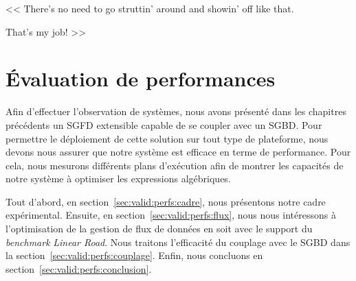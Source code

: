 \begin{savequote}[6cm]
<< There's no need to go struttin' around and showin' off like that. 

\quad That's my job! >>
\end{savequote}

\chapter{Évaluation de performances}\label{chap:valid:perfs}
\chaptertoc

Afin d'effectuer l'observation de systèmes, nous avons présenté dans les chapitres précédents un SGFD extensible capable de se coupler avec un SGBD. Pour permettre le déploiement de cette solution sur tout type de plateforme, nous devons nous assurer que notre système est efficace en terme de performance. Pour cela, nous mesurons différents plans d'exécution afin de montrer les capacités de notre système à optimiser les expressions algébriques.

Tout d'abord, en section~\ref{sec:valid:perfs:cadre}, nous présentons notre cadre expérimental. Ensuite, en section~\ref{sec:valid:perfs:flux}, nous nous intéressons à l'optimisation de la gestion de flux de données en soit avec le support du \textit{benchmark} \textit{Linear Road}. Nous traitons l'efficacité du couplage avec le SGBD dans la section~\ref{sec:valid:perfs:couplage}. Enfin, nous concluons en section~\ref{sec:valid:perfs:conclusion}.





